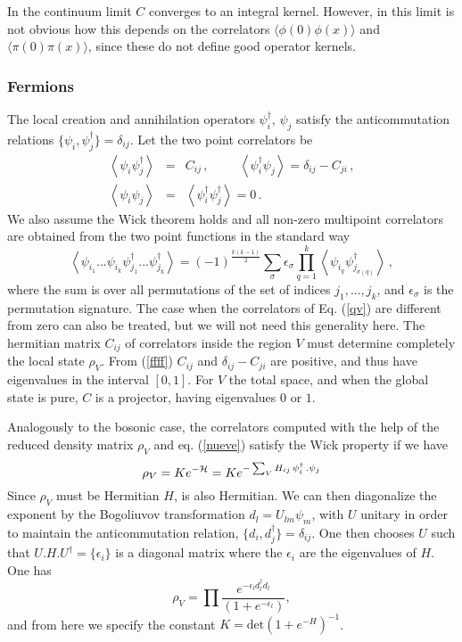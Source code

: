 \documentclass[a4paper]{article}
\begin{document}
In the continuum limit $C$ converges to an integral kernel. However, in this limit is not obvious how this depends on the correlators $\langle \phi(0) \phi(x)\rangle$ and $\langle \pi(0) \pi(x)\rangle$, since these do not define good operator kernels.    

\subsubsection{Fermions}
The local creation and annihilation operators $\psi_{i}^{\dagger }$, $\psi_{j}$
satisfy the anticommutation relations $
\{\psi_{i},\psi_{j}^{\dagger }\}=\delta
_{ij}$. 
 Let the two point correlators be
\begin{eqnarray}
\left< \psi_{i} \psi_{j}^\dagger
 \right> &=& C_{ij} \,,  \hspace{1cm}
\left< \psi_i^\dagger \psi_j \right> = \delta_{ij}- C_{ji} \,,\label{ffff}\\
\left< \psi_{i} \psi_{j}\right> &=& \left< \psi_{i}^\dagger \psi_{j}^\dagger\right>=0\,.\label{qv}
\end{eqnarray}
We also assume the Wick theorem holds and all non-zero multipoint correlators are obtained from the two point functions in the standard way
\begin{equation}
\left<\psi_{i_1}...\psi_{i_k}\psi^\dagger_{j_1}...\psi^\dagger_{j_k}\right>= (-1)^{\frac{k(k-1)}{2}}\sum_\sigma \epsilon_\sigma   \prod_{q=1}^k  \left< \psi_{i_q} \psi_{j_{\sigma(q)}}^\dagger
\right>\,,
\end{equation}
where the sum is over all permutations of the set of indices $j_1,..., j_k$, and $\epsilon_\sigma$ is the permutation signature. 
 The case when the correlators of Eq. (\ref{qv}) are different from zero can also be treated, but we will not need this generality here.   
The hermitian matrix $C_{ij}$ of correlators inside the region $V$ must determine completely the local state $\rho _{V}$. 
From (\ref{ffff}) $C_{ij}$ and $\delta_{ij}- C_{ji}$ are positive, and thus have eigenvalues in the interval $[0,1]$. For $V$ the total space, and when the global state is pure, $C$ is a projector, having eigenvalues $0$ or $1$. 
  
Analogously to the bosonic case, the correlators computed with the help of the reduced density matrix $\rho_V$ and eq. (\ref{nueve}) satisfy the Wick property if we have \cite{wick} 
  \begin{equation}
\rho _{V}=K e^{-{\cal H}}=K e^{-\sum_V H_{ij}\, \psi_{i}^\dagger\,. \psi_{j}}\label{corre}
\end{equation}
 Since $\rho_V$ must be Hermitian $H$, is also Hermitian. We can then diagonalize the exponent by the Bogoliuvov transformation
 $
d_{l}=U_{lm} \psi_m
$, 
with $U$ unitary in order to maintain the anticommutation relation, $\{d_i,d_j^\dagger\}=\delta_{ij}$.
One then chooses $U$ such that $U.H.U^\dagger=\{\epsilon_i \}$ is a diagonal matrix where the $\epsilon_i$ are the eigenvalues of $H$. One has
\begin{equation}
\rho _{V}=\prod \frac{e^{-\epsilon _{l}d_{l}^{\dagger }d_{l}}
}{\left( 1+e^{-\epsilon _{l}}\right) }, \label{diago}
\end{equation}
and from here we specify the constant $K=\textrm{det}(1+e^{-H})^{-1}$.
\end{document}
